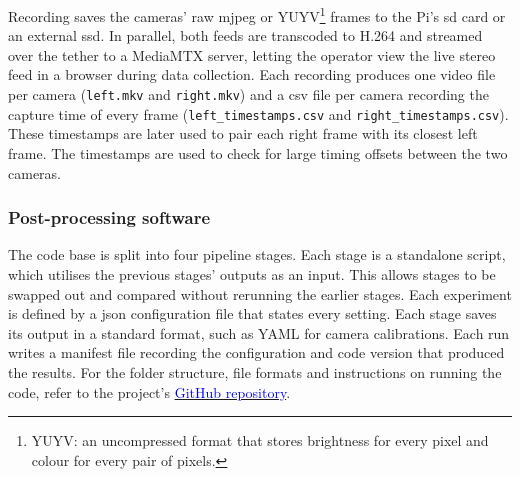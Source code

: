 Recording saves the cameras' raw \gls{mjpeg} or YUYV\footnote{YUYV: an uncompressed format that stores brightness for every pixel and colour for every pair of pixels.} frames to the Pi's \gls{sd} card or an 
external \gls{ssd}. In parallel, both feeds are transcoded to H.264 and streamed 
over the tether to a MediaMTX server, letting the operator view the live stereo 
feed in a browser during data collection. Each recording produces one video file per camera (\texttt{left.mkv} and \texttt{right.mkv}) and a
\gls{csv} file per camera recording the capture time of every frame (\texttt{left\_timestamps.csv} and \texttt{right\_timestamps.csv}).
These timestamps are later used to pair each right frame with its closest left frame. The timestamps are used to check for large
timing offsets between the two cameras.


\subsubsection{Post-processing software}
\label{subsec:ch4.postprocessing}
The code base is split into four pipeline stages. Each stage is a standalone script, 
which utilises the previous stages' outputs as an input. This allows stages to be swapped out and compared without
rerunning the earlier stages. Each experiment is defined by a \acrshort{json} configuration file that states every
setting. Each stage saves its output in a standard
format, such as YAML for camera calibrations. Each run 
writes a manifest file recording the configuration and code version that
produced the results. For the folder structure, file formats and instructions on running the code,
refer to the project's
\href{https://github.com/GlenOJones/UCT_Final_Year_Project}{\textcolor{blue}{GitHub repository}}.

